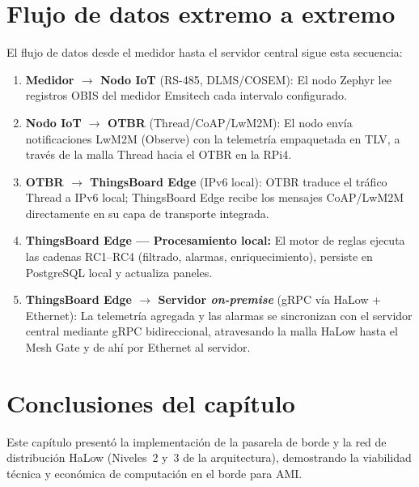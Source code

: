 
\section{Flujo de datos extremo a extremo}
\label{sec:gateway-flujo-datos}

El flujo de datos desde el medidor hasta el servidor central sigue esta secuencia:

\begin{enumerate}
    \item \textbf{Medidor $\rightarrow$ Nodo IoT} (RS-485, DLMS/COSEM): El nodo Zephyr lee registros OBIS del medidor Emsitech cada intervalo configurado.
    \item \textbf{Nodo IoT $\rightarrow$ OTBR} (Thread/CoAP/LwM2M): El nodo envía notificaciones LwM2M (Observe) con la telemetría empaquetada en TLV, a través de la malla Thread hacia el OTBR en la RPi4.
    \item \textbf{OTBR $\rightarrow$ ThingsBoard Edge} (IPv6 local): OTBR traduce el tráfico Thread a IPv6 local; ThingsBoard Edge recibe los mensajes CoAP/LwM2M directamente en su capa de transporte integrada.
    \item \textbf{ThingsBoard Edge --- Procesamiento local:} El motor de reglas ejecuta las cadenas RC1--RC4 (filtrado, alarmas, enriquecimiento), persiste en PostgreSQL local y actualiza paneles.
    \item \textbf{ThingsBoard Edge $\rightarrow$ Servidor \emph{on-premise}} (gRPC vía HaLow + Ethernet): La telemetría agregada y las alarmas se sincronizan con el servidor central mediante gRPC bidireccional, atravesando la malla HaLow hasta el Mesh Gate y de ahí por Ethernet al servidor.
\end{enumerate}


\section{Conclusiones del capítulo}
\label{sec:gateway-conclusiones}

Este capítulo presentó la implementación de la pasarela de borde y la red de distribución HaLow (Niveles~2 y~3 de la arquitectura), demostrando la viabilidad técnica y económica de computación en el borde para AMI.

